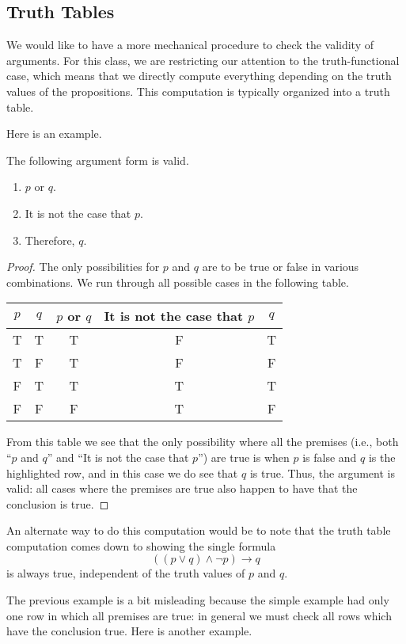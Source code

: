 \subsection{Truth Tables}
We would like to have a more mechanical procedure to check the validity of arguments. For this class, we are restricting our attention to the truth-functional case, which means that we directly compute everything depending on the truth values of the propositions. This computation is typically organized into a truth table.

Here is an example.
\begin{exe}
	The following argument form is valid.
	\begin{enumerate}
		\item $p$ or $q$.
		\item It is not the case that $p$.
		\item Therefore, $q$.
	\end{enumerate}
\end{exe}
\begin{proof}
	The only possibilities for $p$ and $q$ are to be true or false in various combinations. We run through all possible cases in the following table.
	\begin{center}
		\begin{tabular}{c|c||c|c||c}
			$p$ & $q$ & $p$ or $q$ & It is not the case that $p$ & $q$ \\\hline
			T & T & T & F & T \\
			T & F & T & F & F \\
			\color{red}F & \color{red}T & \color{red}T & \color{red}T & \color{red}T \\
			F & F & F & T & F
		\end{tabular}
	\end{center}
	From this table we see that the only possibility where all the premises (i.e., both ``$p$ and $q$'' and ``It is not the case that $p$'') are true is when $p$ is false and $q$ is the highlighted row, and in this case we do see that $q$ is true. Thus, the argument is valid: all cases where the premises are true also happen to have that the conclusion is true.
\end{proof}
\begin{remark}
	An alternate way to do this computation would be to note that the truth table computation comes down to showing the single formula
	\[((p\lor q)\land\lnot p)\to q\]
	is always true, independent of the truth values of $p$ and $q$.
\end{remark}
The previous example is a bit misleading because the simple example had only one row in which all premises are true: in general we must check all rows which have the conclusion true. Here is another example.

